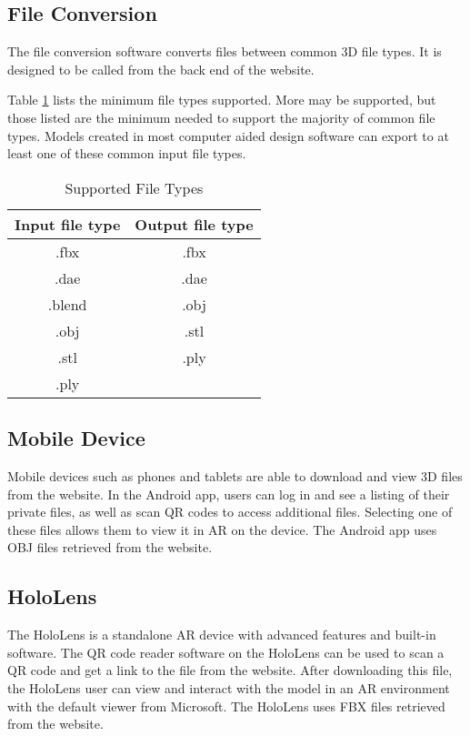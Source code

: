 \subsection{File Conversion}
The file conversion software converts files between common 3D file types. It is designed to be called from the back end of the website.

Table \ref{tab:suportedfiletypes} lists the minimum file types supported.  More may be supported, but those listed are the minimum needed to support the majority of common file types.  
Models created in most computer aided design software can export to at least one of these common input file types.

\begin{table}[!h]
    \centering
    \begin{tabular}{| c | c |}
        \hline
        Input file type & Output file type \\
        \hline
        .fbx & .fbx \\
        .dae & .dae \\
        .blend & .obj \\ 
        .obj & .stl \\
        .stl & .ply \\
        .ply & \\
        \hline
    \end{tabular}
    \caption{Supported File Types}
    \label{tab:suportedfiletypes}
\end{table}

\subsection{Mobile Device}
Mobile devices such as phones and tablets are able to download and view 3D files from the website. In the Android app, users can log in and see a listing of their private files, as well as scan QR codes to access additional files. Selecting one of these files allows them to view it in AR on the device. The Android app uses OBJ files retrieved from the website.

\subsection{HoloLens}
The HoloLens is a standalone AR device with advanced features and built-in software. The QR code reader software on the HoloLens can be used to scan a QR code and get a link to the file from the website. After downloading this file, the HoloLens user can view and interact with the model in an AR environment with the default viewer from Microsoft. The HoloLens uses FBX files retrieved from the website.

